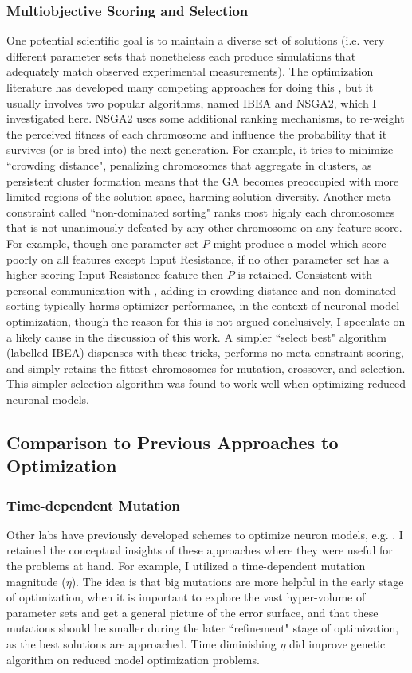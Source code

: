 \subsubsection{Multiobjective Scoring and Selection}
One potential scientific goal is to maintain a diverse set of solutions (i.e. very different parameter sets that nonetheless each produce simulations that adequately match observed experimental measurements).
The optimization literature has developed many competing approaches for doing this \citep{deb2000fast}, but it usually involves two popular algorithms, named IBEA and NSGA2, which I investigated here.
NSGA2 uses some additional ranking mechanisms, to re-weight the perceived fitness of each chromosome and influence the probability that it survives (or is bred into) the next generation.
For example, it tries to minimize ``crowding distance", penalizing chromosomes that aggregate in clusters, as persistent cluster formation means that the GA becomes preoccupied with more limited regions of the solution space, harming solution diversity.
Another meta-constraint called ``non-dominated sorting" ranks most highly each chromosomes that is not unanimously defeated by any other chromosome on any feature score.
For example, though one parameter set $P$ might produce a model which score poorly on all features except Input Resistance, if no other parameter set has a higher-scoring Input Resistance feature then $P$ is retained. Consistent with personal communication with \cite{van2007neurofitter}, adding in crowding distance and non-dominated sorting typically harms optimizer performance, in the context of neuronal model optimization, though the reason for this is not argued conclusively, I speculate on a likely cause in the discussion of this work.
A simpler ``select best" algorithm (labelled IBEA) dispenses with these tricks, performs no meta-constraint scoring, and simply retains the fittest chromosomes for mutation, crossover, and selection. This simpler selection algorithm was found to work well when optimizing reduced neuronal models.

\subsection{Comparison to Previous Approaches to Optimization}

\subsubsection{Time-dependent Mutation}
Other labs have previously developed schemes to optimize neuron models, e.g. \cite{druckmann2007novel}.
I retained the conceptual insights of these approaches where they were useful for the problems at hand.
For example, I utilized a time-dependent mutation magnitude ($\eta$).
The idea is that big mutations are more helpful in the early stage of optimization, when it is important to explore the vast hyper-volume of parameter sets and get a general picture of the error surface, and that these mutations should be smaller during the later ``refinement" stage of optimization, as the best solutions are approached. Time diminishing $\eta$ did improve genetic algorithm on reduced model optimization problems.

